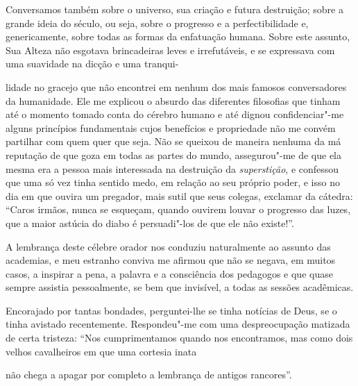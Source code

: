 Conversamos também sobre o universo, sua criação e futura destruição;
sobre a grande ideia do século, ou seja, sobre o progresso e a
perfectibilidade e, genericamente, sobre todas as formas da enfatuação
humana. Sobre este assunto, Sua Alteza não esgotava brincadeiras leves
e irrefutáveis, e se expressava com uma suavidade na dicção e uma
tranqui-

\quebra

\noindent{}lidade no gracejo que não encontrei em nenhum dos mais famosos
conversadores da humanidade. Ele me explicou o absurdo das diferentes
filosofias que tinham até o momento tomado conta do cérebro humano e
até dignou confidenciar"-me alguns princípios fundamentais cujos
benefícios e propriedade não me convém partilhar com quem quer que seja.
Não se queixou de maneira nenhuma da má reputação de que goza em todas
as partes do mundo, assegurou"-me de que ela mesma era a pessoa mais
interessada na destruição da \textit{superstição}, e confessou que uma só vez
tinha sentido medo, em relação ao seu próprio poder, e isso no dia em
que ouvira um pregador, mais sutil que seus colegas, exclamar da
cátedra: “Caros irmãos, nunca se esqueçam, quando
ouvirem louvar o progresso das luzes, que a maior astúcia do diabo é
persuadi"-los de que ele não existe!''.

A lembrança deste célebre orador nos conduziu naturalmente ao assunto
das academias, e meu estranho conviva me afirmou que não se negava, em
muitos casos, a inspirar a pena, a palavra e a consciência dos
pedagogos e que quase sempre assistia pessoalmente, se bem que invisível,
a todas as sessões acadêmicas.

Encorajado por tantas bondades, perguntei-lhe se tinha notícias de
Deus, se o tinha avistado recentemente. Respondeu"-me com uma
despreocupação matizada de certa tristeza: “Nos
cumprimentamos quando nos encontramos, mas como dois velhos
cavalheiros em que uma cortesia inata \linebreak

\quebra

\noindent{}não chega a apagar
por completo a lembrança de antigos rancores''.

